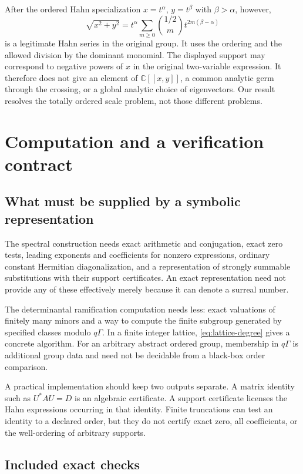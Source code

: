 \documentclass[11pt,letterpaper]{article}
\numberwithin{equation}{section}
\theoremstyle{definition}
\theoremstyle{remark}
\newcommand{\C}{\mathbb C}
\begin{document}
After the ordered Hahn specialization $x=t^\alpha$, $y=t^\beta$ with
$\beta>\alpha$, however,
\[
 \sqrt{x^2+y^2}
  =t^\alpha\sum_{m\ge0}\binom{1/2}{m}t^{2m(\beta-\alpha)}
\]
is a legitimate Hahn series in the original group. It uses the ordering and
the allowed division by the dominant monomial. The displayed support may
correspond to negative powers of $x$ in the original two-variable expression.
It therefore does not give an element of $\C[[x,y]]$, a common analytic germ
through the crossing, or a global analytic choice of eigenvectors. Our result
resolves the totally ordered scale problem, not those different problems.

\section{Computation and a verification contract}
\label{sec:computation}

\subsection{What must be supplied by a symbolic representation}

The spectral construction needs exact arithmetic and conjugation, exact
zero tests, leading exponents and coefficients for nonzero expressions,
ordinary constant Hermitian diagonalization, and a representation of
strongly summable substitutions with their support certificates. An exact
representation need not provide any of these effectively merely because it
can denote a surreal number.

The determinantal ramification computation needs less: exact valuations of
finitely many minors and a way to compute the finite subgroup generated by
specified classes modulo $q\Gamma$. In a finite integer lattice,
\cref{eq:lattice-degree} gives a concrete algorithm. For an arbitrary abstract
ordered group, membership in $q\Gamma$ is additional group data and need
not be decidable from a black-box order comparison.

A practical implementation should keep two outputs separate. A matrix
identity such as $U^*AU=D$ is an algebraic certificate. A support certificate
licenses the Hahn expressions occurring in that identity. Finite truncations
can test an identity to a declared order, but they do not certify exact zero,
all coefficients, or the well-ordering of arbitrary supports.

\subsection{Included exact checks}
\end{document}
